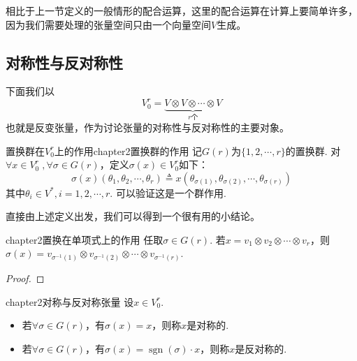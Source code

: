 相比于上一节定义的一般情形的配合运算，这里的配合运算在计算上要简单许多，因为我们需要处理的张量空间只由一个向量空间$V$生成。

\subsection{对称性与反对称性}

下面我们以
\[
	V^{r}_{0}=\underbrace{V\otimes V\otimes \cdots\otimes V}_{r\text{个}}
\]
也就是反变张量，作为讨论张量的对称性与反对称性的主要对象。

\begin{mydef}{置换群在$V^{r}_{0}$上的作用}{chapter2置换群的作用}
记$G(r)$为$\{1,2,\cdots,r\}$的置换群. 对$ \forall x\in V^{r}_{0}\;,\forall\sigma\in G(r)$，定义$\sigma(x)\in V^{r}_{0}$如下：
\[
\sigma(x)(\theta_{1},\theta_{2},\cdots,\theta_{r})\triangleq x \left( \theta_{\sigma(1)},\theta_{\sigma(2)},\cdots,\theta_{\sigma(r)}\right)
\]
其中$\theta_{i}\in V^{\ast},i=1,2,\cdots,r$. 可以验证这是一个群作用.
\end{mydef}

直接由上述定义出发，我们可以得到一个很有用的小结论。

\begin{myprop}{}{chapter2置换在单项式上的作用}
任取$\sigma\in G(r)$. 若$x=v_{1}\otimes v_{2}\otimes \cdots\otimes v_{r}$，则$\sigma(x)=v_{\sigma^{-1}(1)}\otimes v_{\sigma^{-1}(2)}\otimes\cdots\otimes v_{\sigma^{-1}(r)}$.
\end{myprop}

\begin{proof}

\end{proof}




\begin{mydef}{}{chapter2对称与反对称张量}
设$x\in V^{r}_{0}$.
\begin{itemize}
\item 若$\forall \sigma\in G(r)$，有$\sigma(x)=x$，则称$x$是对称的.
\item 若$\forall \sigma\in G(r)$，有$\sigma(x)=\operatorname{sgn}(\sigma)\cdot x$，则称$x$是反对称的.
\end{itemize}
\end{mydef}

